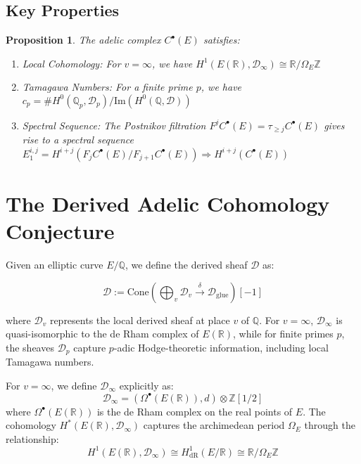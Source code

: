 \documentclass{article}
\theoremstyle{plain}
\newtheorem{proposition}[theorem]{Proposition}
\theoremstyle{definition}
\theoremstyle{remark}
\begin{document}
\subsection{Key Properties}

\begin{proposition}
The adelic complex $C^\bullet(E)$ satisfies:
\begin{enumerate}
\item Local Cohomology: For $v = \infty$, we have $H^1(E(\mathbb{R}), \mathcal{D}_\infty) \cong \mathbb{R}/\Omega_E\mathbb{Z}$
\item Tamagawa Numbers: For a finite prime $p$, we have $c_p = \#H^0(\mathbb{Q}_p, \mathcal{D}_p)/\text{Im}(H^0(\mathbb{Q}, \mathcal{D}))$
\item Spectral Sequence: The Postnikov filtration $F^j C^\bullet(E) = \tau_{\geq j}C^\bullet(E)$ gives rise to a spectral sequence $E_1^{i,j} = H^{i+j}(F_j C^\bullet(E)/F_{j+1}C^\bullet(E)) \Rightarrow H^{i+j}(C^\bullet(E))$
\end{enumerate}
\end{proposition}

\section{The Derived Adelic Cohomology Conjecture}

Given an elliptic curve $E/\mathbb{Q}$, we define the derived sheaf $\mathcal{D}$ as:

\begin{equation}
\mathcal{D} := \text{Cone}\left(\bigoplus_v \mathcal{D}_v \xrightarrow{\delta} \mathcal{D}_{\text{glue}}\right)[-1]
\end{equation}

where $\mathcal{D}_v$ represents the local derived sheaf at place $v$ of $\mathbb{Q}$. For $v = \infty$, $\mathcal{D}_{\infty}$ is quasi-isomorphic to the de Rham complex of $E(\mathbb{R})$, while for finite primes $p$, the sheaves $\mathcal{D}_p$ capture $p$-adic Hodge-theoretic information, including local Tamagawa numbers.
\vspace{.3cm} 

For $v = \infty$, we define $\mathcal{D}_{\infty}$ explicitly as:
\begin{equation}
\mathcal{D}_{\infty} = (\Omega^{\bullet}(E(\mathbb{R})), d) \otimes \mathbb{Z}[1/2]
\end{equation}
where $\Omega^{\bullet}(E(\mathbb{R}))$ is the de Rham complex on the real points of $E$. The cohomology $H^*(E(\mathbb{R}), \mathcal{D}_{\infty})$ captures the archimedean period $\Omega_E$ through the relationship:
\begin{equation}
H^1(E(\mathbb{R}), \mathcal{D}_{\infty}) \cong H^1_{\text{dR}}(E/\mathbb{R}) \cong \mathbb{R}/\Omega_E\mathbb{Z}
\end{equation}
\end{document}
